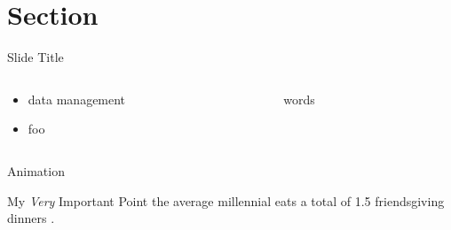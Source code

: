 \section{Section}

\begin{frame}{Slide Title}
\begin{columns}
\begin{column}{0.6\textwidth}
\begin{itemize}
\item data management
\item foo
\end{itemize}
\end{column}
\begin{column}{0.4\textwidth}
\begin{center}
words
\end{center}
\end{column}
\end{columns}
\end{frame}

\begin{frame}{Animation}



\end{frame}

\begin{frame}{My \textit{Very} Important Point}
\Huge
{\sansforgetica the average millennial eats a total of 1.5 friendsgiving dinners}
\cite{neilsen2016tradition}.
\end{frame}
